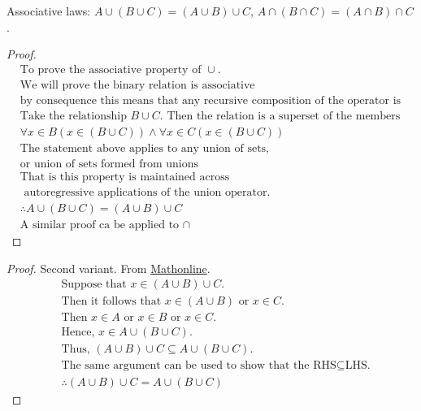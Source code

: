 \begin{question}
  Associative laws: $A \cup (B \cup C) = (A \cup B) \cup C$, $A \cap (B \cap C) = (A \cap B) \cap C$.
\end{question}
\begin{proof}
  \begin{align*}
    & \text{To prove the associative property of } \cup. \\
    & \text{We will prove the binary relation is associative} \\
    & \text{by consequence this means that any recursive composition of the operator is also associative.} \\
    & \text{Take the relationship } B \cup C. \text{ Then the relation is a superset of the members} \\ 
    & \forall x \in B(x \in (B \cup C)) \land \forall x \in C(x \in (B \cup C)) \\
    & \text{The statement above applies to any union of sets, } \\
    & \text{or union of sets formed from unions} \\
    & \text{That is this property is maintained across} \\
    & \text{ autoregressive applications of the union operator.} \\
    & \therefore A \cup (B \cup C) = (A \cup B) \cup C \\
    & \text{A similar proof ca be applied to } \cap
  \end{align*}
\end{proof}
\begin{proof}
  Second variant. From \href{http://mathonline.wikidot.com/associative-laws-of-sets}{Mathonline}.
  \begin{align*}
    & \text{Suppose that } x \in (A \cup B) \cup C. \\
    & \text{Then it follows that } x \in (A \cup B) \text{ or } x \in C. \\
    & \text{Then } x \in A \text{ or } x \in B \text{ or } x \in C. \\
    & \text{Hence, } x \in A \cup (B \cup C). \\
    & \text{Thus, } (A \cup B) \cup C \subseteq A \cup (B \cup C). \\
    & \text{The same argument can be used to show that the RHS} \subseteq \text{LHS.} \\
    & \therefore (A \cup B) \cup C = A \cup (B \cup C)
  \end{align*}
\end{proof}

